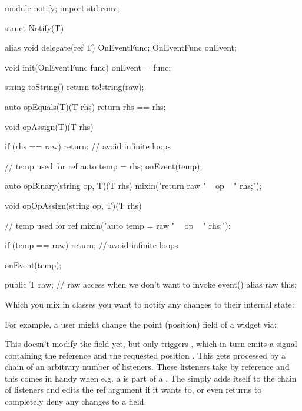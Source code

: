 \begin{dcode}
module notify;
import std.conv;

struct Notify(T)
{
    alias void delegate(ref T) OnEventFunc;
    OnEventFunc onEvent;

    void init(OnEventFunc func) {
        onEvent = func;
    }

    string toString()
    {
        return to!string(raw);
    }

    auto opEquals(T)(T rhs)
    {
        return rhs == rhs;
    }

    void opAssign(T)(T rhs)
    {
        if (rhs == raw)
            return;  // avoid infinite loops
        
        // temp used for ref
        auto temp = rhs;  
        onEvent(temp);
    }

    auto opBinary(string op, T)(T rhs)
    {
        mixin("return raw " ~ op ~ " rhs;");
    }

    void opOpAssign(string op, T)(T rhs)
    {
        // temp used for ref
        mixin("auto temp = raw " ~ op ~ " rhs;");  

        if (temp == raw)
            return;  // avoid infinite loops

        onEvent(temp);
    }

    public T raw;  // raw access when we don't want to invoke event()
    alias raw this;
}
\end{dcode}

Which you mix in classes you want to notify any changes to their internal state:


For example, a user might change the point (position) field of a widget via: 

\begin{dcode}
Point moveBy = Point(10, 0); widget.point += moveBy;}. 
\end{dcode}

This doesn't modify the field yet, but only triggers , which in turn emits a signal containing the  reference and the requested position . This gets processed by a chain of an arbitrary number of listeners. These listeners take  by reference and this comes in handy when e.g. a  is part of a . The  simply adds itself to the chain of listeners and edits the ref argument if it wants to, or even returns  to completely deny any changes to a field.

